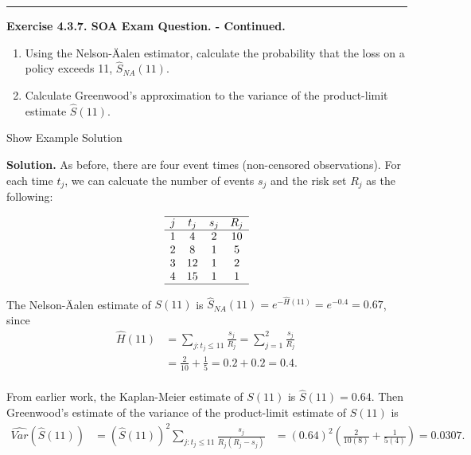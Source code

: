 \documentclass[]{book}
\providecommand{\tightlist}{%
  \setlength{\itemsep}{0pt}\setlength{\parskip}{0pt}}
\theoremstyle{definition}
\theoremstyle{definition}
\theoremstyle{definition}
\theoremstyle{remark}
\begin{document}
\begin{center}\rule{0.5\linewidth}{\linethickness}\end{center}

\textbf{Exercise 4.3.7. SOA Exam Question. - Continued.}

\begin{enumerate}
\def\labelenumi{\alph{enumi})}
\tightlist
\item
  Using the Nelson-Äalen estimator, calculate the probability that the
  loss on a policy exceeds 11, \(\hat{S}_{NA}(11)\).
\item
  Calculate Greenwood's approximation to the variance of the
  product-limit estimate \(\hat{S}(11)\).
\end{enumerate}

Show Example Solution

\hypertarget{toggleExampleSelect.3.7}{}
\textbf{Solution.} As before, there are four event times (non-censored
observations). For each time \(t_j\), we can calcuate the number of
events \(s_j\) and the risk set \(R_j\) as the following:

\[\begin{array}{cccc}
\hline
j & t_j & s_j & R_j \\
\hline
1 & 4 & 2 & 10 \\
2 & 8 & 1 & 5 \\
3 & 12 & 1 & 2 \\
4 & 15 & 1 & 1 \\
\hline
\end{array}\]

The Nelson-Äalen estimate of \(S(11)\) is
\(\hat{S}_{NA}(11)=e^{-\hat{H}(11)} = e^{-0.4} = 0.67\), since
\[\begin{aligned}
\hat{H}(11) &= \sum_{j:t_j\leq 11} \frac{s_j}{R_j}  = \sum_{j=1}^{2} \frac{s_j}{R_j}  \\
&= \frac{2}{10} + \frac{1}{5}  = 0.2 + 0.2 = 0.4 .\\
\end{aligned}\]

From earlier work, the Kaplan-Meier estimate of \(S(11)\) is
\(\hat{S}(11) = 0.64\). Then Greenwood's estimate of the variance of the
product-limit estimate of \(S(11)\) is \[\begin{aligned}
\widehat{Var}(\hat{S}(11)) &= (\hat{S}(11))^2 \sum_{j:t_j\leq 11} \frac{s_j}{R_j(R_j-s_j)} 
&= (0.64)^2 \left(\frac{2}{10(8)} + \frac{1}{5(4)} \right)  = 0.0307. \\
\end{aligned}\]
\end{document}
